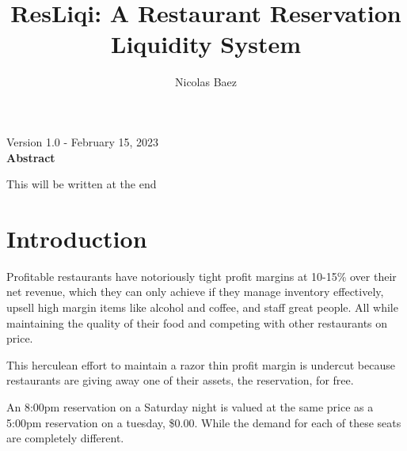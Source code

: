 \documentclass{article}
\title{\Huge ResLiqi: A Restaurant Reservation Liquidity System}
\date{\vspace{-5ex}} %
\author{\LARGE Nicolas Baez}
\begin{document}
	\maketitle
	\begin{center}
		\large Version 1.0 - February 15, 2023\\
		\vspace{25pt}
		\textbf{Abstract}
	\end{center}
		This will be written at the end
	\newpage
	\tableofcontents
	\newpage
	\section{Introduction}
	
	\hspace{1cm} Profitable restaurants have notoriously tight profit margins at 10-15\% over their net revenue, which they can only achieve if they manage inventory effectively, upsell high margin items like alcohol and coffee, and staff great people.  All while maintaining the quality of their food and competing with other restaurants on price.
	
	\hspace{1cm}This herculean effort to maintain a razor thin profit margin is undercut because restaurants are giving away one of their assets, the reservation, for free.
	
	\hspace{1cm}An 8:00pm reservation on a Saturday night is valued at the same price as a 5:00pm reservation on a tuesday, \$0.00.  While the demand for each of these seats are completely different.
	\\
	\begin{center}
	\end{center}
	
\end{document}
